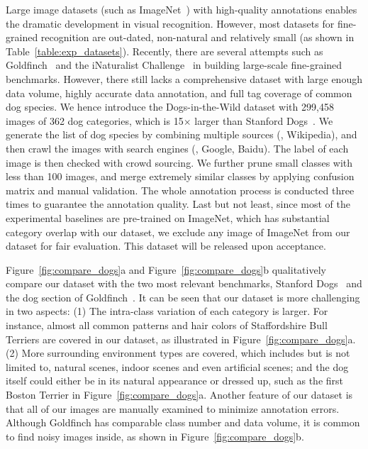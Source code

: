 \documentclass[runningheads]{llncs}
\begin{document}
Large image datasets (such as ImageNet~\cite{deng2009imagenet}) with high-quality annotations enables the dramatic development in visual recognition.
However, most datasets for fine-grained recognition are out-dated, non-natural and relatively small (as shown in Table~\ref{table:exp_datasets}).
Recently, there are several attempts such as Goldfinch~\cite{krause2016unreasonable} and the iNaturalist Challenge~\cite{van2017inaturalist} in building large-scale fine-grained benchmarks.
However, there still lacks a comprehensive dataset with large enough data volume, highly accurate data annotation, and full tag coverage of common dog species.
We hence introduce the Dogs-in-the-Wild dataset with 299,458 images of 362 dog categories, which is 15$\times$ larger than Stanford Dogs~\cite{khosla2011novel}.
We generate the list of dog species by combining multiple sources (\eg, Wikipedia), and then crawl the images with search engines (\eg, Google, Baidu).
The label of each image is then checked with crowd sourcing.
We further prune small classes with less than 100 images, and merge extremely similar classes by applying confusion matrix and manual validation.
The whole annotation process is conducted three times to guarantee the annotation quality.
Last but not least, since most of the experimental baselines are pre-trained on ImageNet, which has substantial category overlap with our dataset, we exclude any image of ImageNet from our dataset for fair evaluation.
This dataset will be released upon acceptance.

Figure~\ref{fig:compare_dogs}a and Figure~\ref{fig:compare_dogs}b qualitatively compare our dataset with the two most relevant benchmarks, Stanford Dogs~\cite{khosla2011novel} and the dog section of Goldfinch~\cite{krause2016unreasonable}.
It can be seen that our dataset is more challenging in two aspects:
(1) The intra-class variation of each category is larger.
For instance, almost all common patterns and hair colors of Staffordshire Bull Terriers are covered in our dataset, as illustrated in Figure~\ref{fig:compare_dogs}a.
(2) More surrounding environment types are covered, which includes but is not limited to, natural scenes, indoor scenes and even artificial scenes; and the dog itself could either be in its natural appearance or dressed up, such as the first Boston Terrier in Figure~\ref{fig:compare_dogs}a.
Another feature of our dataset is that all of our images are manually examined to minimize annotation errors.
Although Goldfinch has comparable class number and data volume, it is common to find noisy images inside, as shown in Figure~\ref{fig:compare_dogs}b.
\end{document}
